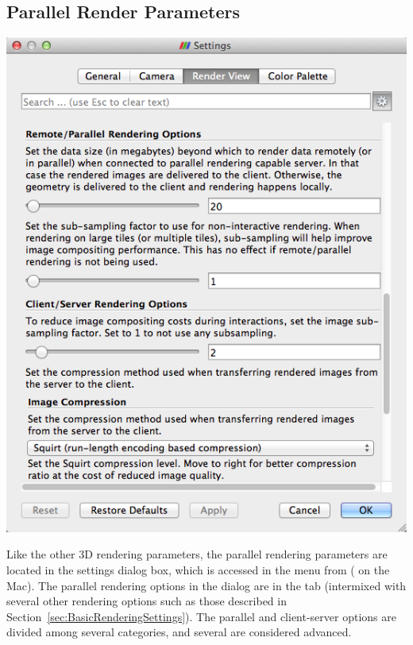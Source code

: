 \subsection{Parallel Render Parameters}
\label{sec:ParallelRenderParameters}

\begin{inlinefig}
  \includegraphics[width=0.8\scw]{images/SettingsServer}
\end{inlinefig}

Like the other 3D rendering parameters, the parallel rendering parameters
are located in the settings dialog box, which is accessed in the menu from
 \ra {} ( \ra {} on the
Mac).  The parallel rendering options in the dialog are in the  tab (intermixed with several other rendering options such as those
described in Section~\ref{sec:BasicRenderingSettings}). The parallel and
client-server options are divided among several categories, and several are
considered advanced.

